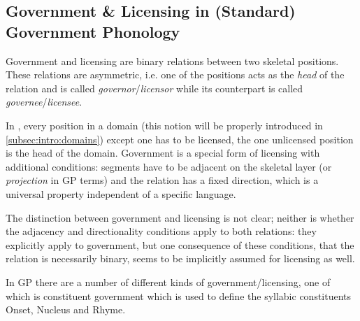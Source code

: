 \subsection{Government \& Licensing in (Standard) Government Phonology}
\label{subsec:intro:gov lic in SGP}

Government and licensing are binary relations between two
skeletal positions. These relations are asymmetric, i.e.
one of the positions acts as the \emph{head} of the relation and
is called \emph{governor}/\emph{licensor} while its counterpart
is called \emph{governee}/\emph{licensee}.

In \Cite{kaye1990}, every position in a domain
(this notion will be properly introduced in \cref{subsec:intro:domains})
except one has to be licensed, the one unlicensed position is the
head of the domain. Government is a special form of licensing with
additional conditions: segments have to be adjacent on the skeletal layer
(or \emph{projection} in \gls{GP} terms) and the relation has a fixed
direction, which is a universal property independent of a specific language.

The distinction between government and licensing is not clear;
neither is whether the adjacency and directionality conditions apply
to both relations: they explicitly apply to government, but one consequence
of these conditions, that the relation is necessarily binary\footnotemark,
seems to be implicitly assumed for licensing as well.

In \gls{GP} there are a number of different kinds of government/licensing,
one of which is constituent government which is used to define the syllabic
constituents Onset, Nucleus and Rhyme. 

